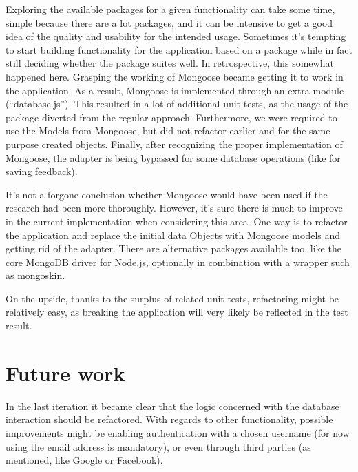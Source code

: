 Exploring the available packages for a given functionality can take some time,
simple because there are a lot packages, and it can be intensive to get a good
idea of the quality and usability for the intended usage. Sometimes it's
tempting to start building functionality for the application based on a package
while in fact still deciding whether the package suites well. In retrospective,
this somewhat happened here. Grasping the working of Mongoose became getting it
to work in the application. As a result, Mongoose is implemented through an 
extra module (``database.js''). This resulted in a lot of additional 
unit-tests, as the usage of the package diverted from the regular approach. 
Furthermore, we were required to use the Models from Mongoose, but did not
refactor earlier and for the same purpose created objects. Finally, after 
recognizing the proper implementation of Mongoose, the adapter is being bypassed
for some database operations (like for saving feedback).

It's not a forgone conclusion whether Mongoose would have been used if the
research had been more thoroughly. However, it's sure there is much to improve
in the current implementation when considering this area. One way is to refactor
the application and replace the initial data Objects with Mongoose models and
getting rid of the adapter. There are alternative packages available too, like 
the core MongoDB driver for Node.js, optionally in combination with a wrapper 
such as mongoskin. 

On the upside, thanks to the surplus of related unit-tests, refactoring might be 
relatively easy, as breaking the application will very likely be reflected in 
the test result.

\section{Future work}
In the last iteration it became clear that the logic concerned with the 
database interaction should be refactored. With regards to other 
functionality, possible improvements might be enabling
authentication with a chosen username (for now using the email address is
mandatory), or even through third parties 
(as mentioned, like Google or Facebook).


